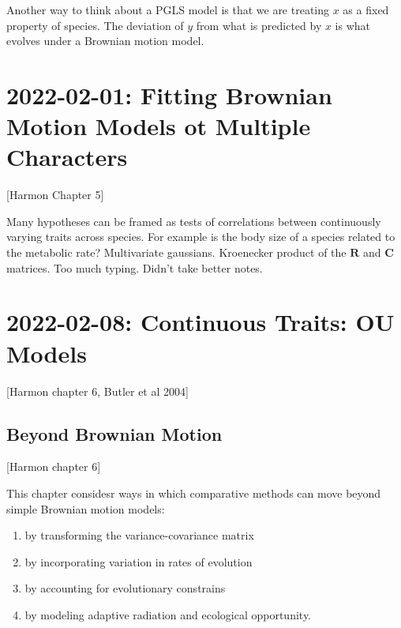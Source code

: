 \documentclass{article}
\begin{document}
Another way to think about a PGLS model is that we are treating $x$ as a fixed
property of species. The deviation of $y$ from what is predicted by $x$ is what
evolves under a Brownian motion model.
\section{2022-02-01: Fitting Brownian Motion Models ot Multiple Characters}
[Harmon Chapter 5]

Many hypotheses can be framed as tests of correlations between continuously varying traits across species. For example is the body size of a species related to the metabolic rate? Multivariate gaussians. Kroenecker product of the $\mathbf{R}$ and $\mathbf{C}$ matrices. Too much typing. Didn't take better notes.

\section{2022-02-08: Continuous Traits: OU Models}
[Harmon chapter 6, Butler et al 2004]

\subsection{Beyond Brownian Motion}
[Harmon chapter 6]

This chapter considesr ways in which comparative methods can move beyond simple
Brownian motion models:
\begin{enumerate}
  \item by transforming the variance-covariance matrix
  \item by incorporating variation in rates of evolution
  \item by accounting for evolutionary constrains
  \item by modeling adaptive radiation and ecological opportunity.
\end{enumerate}
\end{document}
